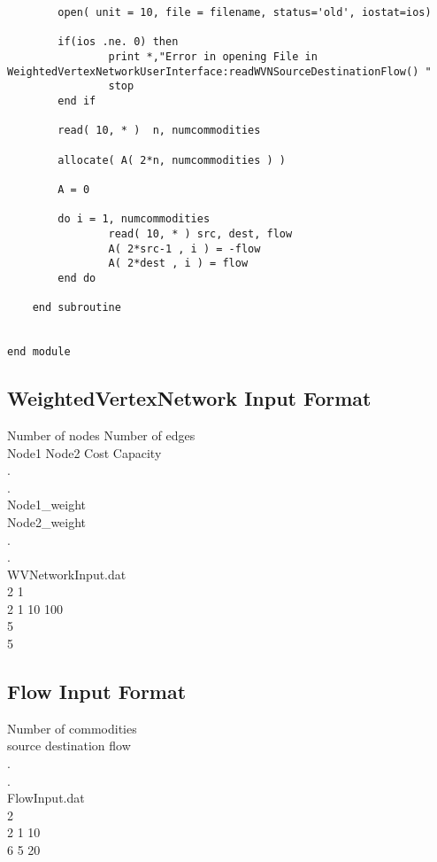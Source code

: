\documentclass[10pt,a4paper,margin = 1.25cm]{article}
\begin{document}
\begin{lstlisting}
        open( unit = 10, file = filename, status='old', iostat=ios)
        
        if(ios .ne. 0) then
        		print *,"Error in opening File in WeightedVertexNetworkUserInterface:readWVNSourceDestinationFlow() "
        		stop
        end if
        
        read( 10, * )  n, numcommodities
  
        allocate( A( 2*n, numcommodities ) )
        
        A = 0
         
        do i = 1, numcommodities
        		read( 10, * ) src, dest, flow
        		A( 2*src-1 , i ) = -flow
        		A( 2*dest , i ) = flow
        end do
        
    end subroutine


end module
\end{lstlisting}

\subsection*{WeightedVertexNetwork Input Format}
Number of nodes \quad Number of edges\\
Node1 \quad Node2 \quad Cost \quad  Capacity\\
.\\
.\\
Node1\_weight\\
Node2\_weight\\
.\\
.\\   
WVNetworkInput.dat\\
    
2 1\\
2 1 10 100\\
5\\
5\\


\subsection*{Flow Input Format}

Number of commodities\\
source \quad destination \quad flow\\
.\\
.\\
FlowInput.dat\\
2\\
2 1 10\\
6 5 20\\
\end{document}
